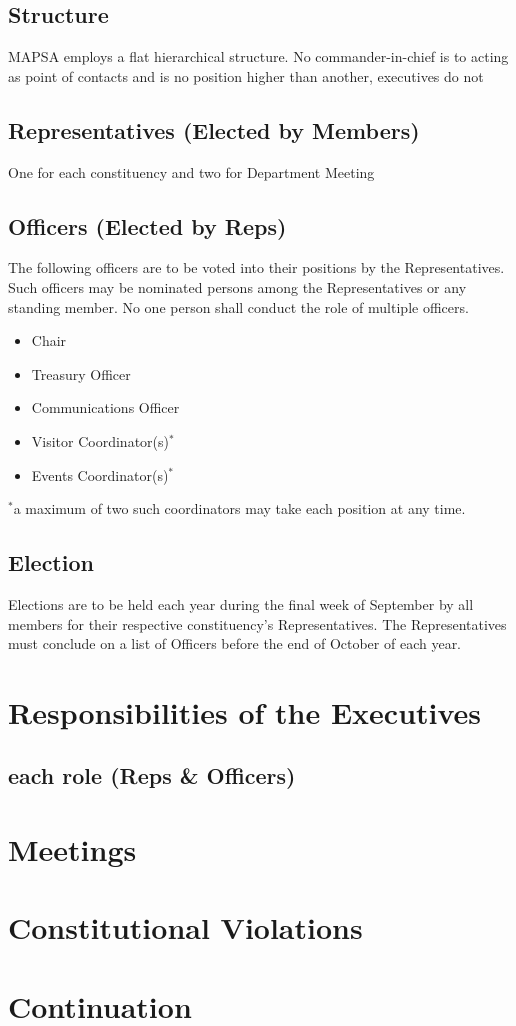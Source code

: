 \documentclass[onecolumn,aps,prd]{revtex4-2}
\begin{document}
\subsection{Structure}
MAPSA employs a flat hierarchical structure. No commander-in-chief is to  acting as point of contacts and  is no position higher than another, executives do not 
\subsection{Representatives (Elected by Members)}
One for each constituency and two for Department Meeting 
\subsection{Officers (Elected by Reps)}
The following officers are to be voted into their positions by the Representatives. Such officers may be nominated persons among the Representatives or any standing member. No one person shall conduct the role of multiple officers.
\begin{itemize}
	\item Chair
	\item Treasury Officer
	\item Communications Officer
	\item Visitor Coordinator(s)$^*$
	\item Events Coordinator(s)$^*$
\end{itemize}
$^*$a maximum of two such coordinators may take each position at any time.
\subsection{Election}
Elections are to be held each year during the final week of September by all members for their respective constituency's Representatives. The Representatives must conclude on a list of Officers before the end of October of each year.

\section{Responsibilities of the Executives}
\subsection{each role (Reps \& Officers)}

\section{Meetings}


\section{Constitutional Violations}
\section{Continuation }
\end{document}
